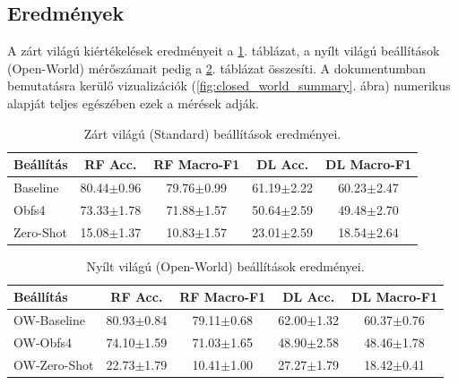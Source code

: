 \documentclass[a4paper,oneside]{article}
\begin{document}
\subsection{Eredmények}

A zárt világú kiértékelések eredményeit a \ref{tab:results_closed_world}. táblázat, a nyílt világú beállítások (Open-World) mérőszámait pedig a \ref{tab:results_open_world}. táblázat összesíti.
A dokumentumban bemutatásra kerülő vizualizációk (\ref{fig:closed_world_summary}. ábra) numerikus alapját teljes egészében ezek a mérések adják.
\begin{table}[tbp]
    \caption{Zárt világú (Standard) beállítások eredményei.}
    \label{tab:results_closed_world}
    \vspace{2mm}
    \centering
    \begin{tabular}{lcccc}
        \toprule
        \textbf{Beállítás} & \textbf{RF Acc.} & \textbf{RF Macro-F1} & \textbf{DL Acc.} & \textbf{DL Macro-F1} \\ \midrule
        Baseline & 80.44$\pm$0.96 & 79.76$\pm$0.99 & 61.19$\pm$2.22 & 60.23$\pm$2.47 \\
        Obfs4 & 73.33$\pm$1.78 & 71.88$\pm$1.57 & 50.64$\pm$2.59 & 49.48$\pm$2.70 \\
        Zero-Shot & 15.08$\pm$1.37 & 
10.83$\pm$1.57 & 23.01$\pm$2.59 & 18.54$\pm$2.64 \\
        \bottomrule
    \end{tabular}
\end{table}

\begin{table}[tbp]
    \caption{Nyílt világú (Open-World) beállítások eredményei.}
    \label{tab:results_open_world}
    \vspace{2mm}
    \centering
    \begin{tabular}{lcccc}
        \toprule
        \textbf{Beállítás} & \textbf{RF Acc.} & \textbf{RF Macro-F1} & \textbf{DL Acc.} & \textbf{DL Macro-F1} \\ \midrule
        OW-Baseline & 80.93$\pm$0.84 & 79.11$\pm$0.68 & 62.00$\pm$1.32 & 60.37$\pm$0.76 \\
        OW-Obfs4 & 74.10$\pm$1.59 & 
71.03$\pm$1.65 & 48.90$\pm$2.58 & 48.46$\pm$1.78 \\
        OW-Zero-Shot & 22.73$\pm$1.79 & 10.41$\pm$1.00 & 27.27$\pm$1.79 & 18.42$\pm$0.41 \\
        \bottomrule
    \end{tabular}
\end{table}
\end{document}
